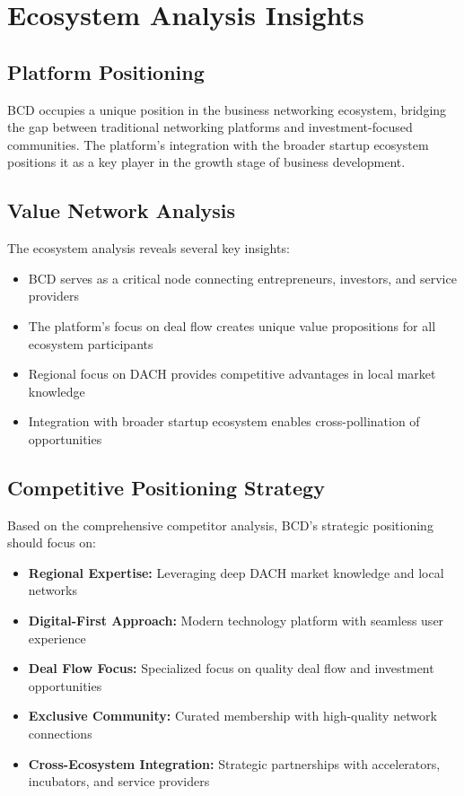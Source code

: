 \section{Ecosystem Analysis Insights}

\subsection{Platform Positioning}
BCD occupies a unique position in the business networking ecosystem, bridging the gap between traditional networking platforms and investment-focused communities. The platform's integration with the broader startup ecosystem positions it as a key player in the growth stage of business development.

\subsection{Value Network Analysis}
The ecosystem analysis reveals several key insights:
\begin{itemize}
    \item BCD serves as a critical node connecting entrepreneurs, investors, and service providers
    \item The platform's focus on deal flow creates unique value propositions for all ecosystem participants
    \item Regional focus on DACH provides competitive advantages in local market knowledge
    \item Integration with broader startup ecosystem enables cross-pollination of opportunities
\end{itemize}

\subsection{Competitive Positioning Strategy}
Based on the comprehensive competitor analysis, BCD's strategic positioning should focus on:
\begin{itemize}
    \item \textbf{Regional Expertise:} Leveraging deep DACH market knowledge and local networks
    \item \textbf{Digital-First Approach:} Modern technology platform with seamless user experience
    \item \textbf{Deal Flow Focus:} Specialized focus on quality deal flow and investment opportunities
    \item \textbf{Exclusive Community:} Curated membership with high-quality network connections
    \item \textbf{Cross-Ecosystem Integration:} Strategic partnerships with accelerators, incubators, and service providers
\end{itemize}

